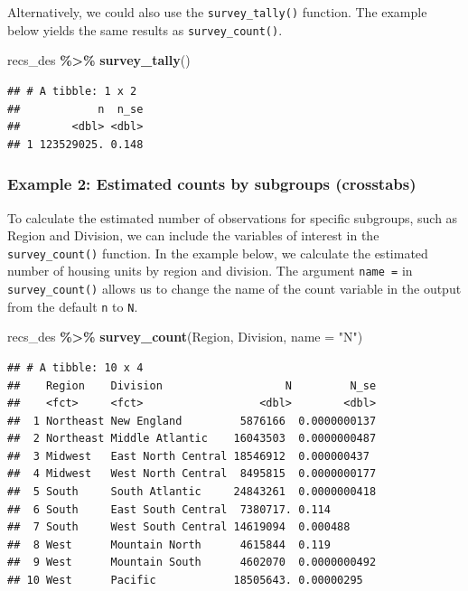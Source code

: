 \documentclass[
]{krantz}
\makeatletter
\newenvironment{Shaded}{\begin{snugshade}}{\end{snugshade}}
\newcommand{\AttributeTok}[1]{\textcolor[rgb]{0.27,0.27,0.27}{#1}}
\newcommand{\FunctionTok}[1]{\textcolor[rgb]{0.27,0.27,0.27}{\textbf{#1}}}
\newcommand{\NormalTok}[1]{#1}
\newcommand{\SpecialCharTok}[1]{\textcolor[rgb]{0.43,0.43,0.43}{\textbf{#1}}}
\newcommand{\StringTok}[1]{\textcolor[rgb]{0.5,0.5,0.5}{#1}}
\newenvironment{kframe}{%
\medskip{}
\setlength{\fboxsep}{.8em}
 \def\at@end@of@kframe{}%
 \ifinner\ifhmode%
  \def\at@end@of@kframe{\end{minipage}}%
  \begin{minipage}{\columnwidth}%
 \fi\fi%
 \def\FrameCommand##1{\hskip\@totalleftmargin \hskip-\fboxsep
 \colorbox{shadecolor}{##1}\hskip-\fboxsep
     \hskip-\linewidth \hskip-\@totalleftmargin \hskip\columnwidth}%
 \MakeFramed {\advance\hsize-\width
   \@totalleftmargin\z@ \linewidth\hsize
   \@setminipage}}%
 {\par\unskip\endMakeFramed%
 \at@end@of@kframe}
\renewenvironment{Shaded}{\begin{kframe}}{\end{kframe}}
\makeatother
\begin{document}
Alternatively, we could also use the \texttt{survey\_tally()} function. The example below yields the same results as \texttt{survey\_count()}.

\begin{Shaded}
\begin{Highlighting}[]
\NormalTok{recs\_des }\SpecialCharTok{\%\textgreater{}\%}
  \FunctionTok{survey\_tally}\NormalTok{()}
\end{Highlighting}
\end{Shaded}

\begin{verbatim}
## # A tibble: 1 x 2
##            n  n_se
##        <dbl> <dbl>
## 1 123529025. 0.148
\end{verbatim}

\hypertarget{example-2-estimated-counts-by-subgroups-crosstabs}{%
\subsubsection*{Example 2: Estimated counts by subgroups (crosstabs)}\label{example-2-estimated-counts-by-subgroups-crosstabs}}


To calculate the estimated number of observations for specific subgroups, such as Region and Division, we can include the variables of interest in the \texttt{survey\_count()} function. In the example below, we calculate the estimated number of housing units by region and division. The argument \texttt{name\ =} in \texttt{survey\_count()} allows us to change the name of the count variable in the output from the default \texttt{n} to \texttt{N}.

\begin{Shaded}
\begin{Highlighting}[]
\NormalTok{recs\_des }\SpecialCharTok{\%\textgreater{}\%}
  \FunctionTok{survey\_count}\NormalTok{(Region, Division, }\AttributeTok{name =} \StringTok{"N"}\NormalTok{)}
\end{Highlighting}
\end{Shaded}

\begin{verbatim}
## # A tibble: 10 x 4
##    Region    Division                   N         N_se
##    <fct>     <fct>                  <dbl>        <dbl>
##  1 Northeast New England         5876166  0.0000000137
##  2 Northeast Middle Atlantic    16043503  0.0000000487
##  3 Midwest   East North Central 18546912  0.000000437 
##  4 Midwest   West North Central  8495815  0.0000000177
##  5 South     South Atlantic     24843261  0.0000000418
##  6 South     East South Central  7380717. 0.114       
##  7 South     West South Central 14619094  0.000488    
##  8 West      Mountain North      4615844  0.119       
##  9 West      Mountain South      4602070  0.0000000492
## 10 West      Pacific            18505643. 0.00000295
\end{verbatim}
\end{document}
